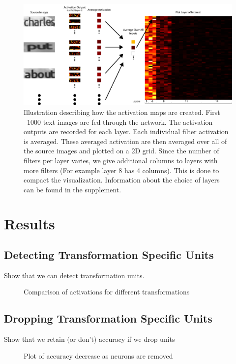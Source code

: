 \documentclass[10pt,twocolumn,letterpaper]{article}
\begin{document}
\begin{figure}
\includegraphics[width=1\textwidth]{Figures/activations_map_overview/act_map_overview-01.png}
\caption{Illustration describing how the activation maps are created. First ~1000 text images are fed through the network. The activation outputs are recorded for each layer. Each individual filter activation is averaged. These averaged activation are then averaged over all of the source images and plotted on a 2D grid. Since the number of filters per layer varies, we give additional columns to layers with more filters (For example layer 8 has 4 columns). This is done to compact the visualization. Information about the choice of layers can be found in the supplement.}
\label{fig:subvis}
\end{figure}

\section{Results}

\subsection{Detecting Transformation Specific Units}
Show that we can detect transformation units.

\begin{figure}
\caption{Comparison of activations for different transformations}
\label{fig:comp}
\end{figure}

\subsection{Dropping Transformation Specific Units}
Show that we retain (or don't) accuracy if we drop units

\begin{figure}
\caption{Plot of accuracy decrease as neurons are removed}
\label{fig:comp}
\end{figure}
\end{document}
